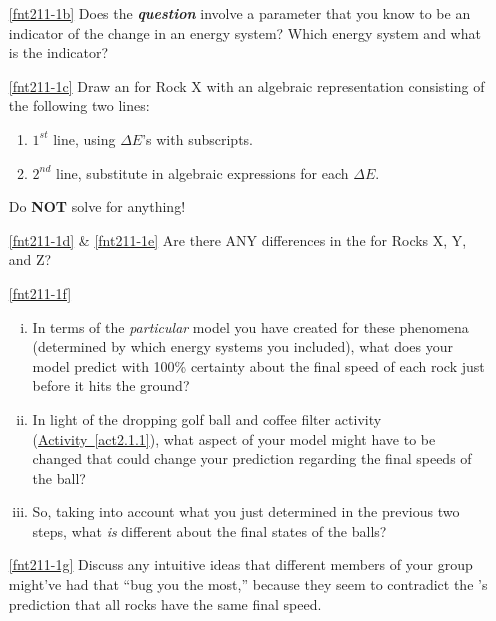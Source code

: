 \begin{enumerate}
	\item[\eqref{fnt211-1b}]	Does the \textbf{\em question} involve a parameter that you know to be an indicator of the change in an energy system?  Which energy system and what is the indicator?
	
	\item[\eqref{fnt211-1c}]	Draw an \EnergyDiagram{} for Rock X with an algebraic representation consisting of the following two lines:
	\begin{enumerate}
		\item $1^{st}$ line, using $\Delta E$'s with subscripts.
		\item $2^{nd}$ line, substitute in algebraic expressions for each $\Delta E$.
	\end{enumerate}
	Do \textbf{NOT} solve for anything!
	
	\item[\eqref{fnt211-1d} \& \eqref{fnt211-1e}] Are there ANY differences in the \EnergyDiagrams{} for Rocks X, Y, and Z?
	
	\item[\eqref{fnt211-1f}] \begin{enumerate}[(i)]
		\item In terms of the {\em particular} model you have created for these phenomena (determined by which energy systems you included), what does your model predict with 100\% certainty about the final speed of each rock just before it hits the ground?
		\label{fnt211-1fi}
		
		\item In light of the dropping golf ball and coffee filter activity (\hyperref[act2.1.1]{Activity~\ref*{act2.1.1}}), what aspect of your model might have to be changed that could change your prediction regarding the final speeds of the ball?
		
		\item So, taking into account what you just determined in the previous two steps, what \emph{is} different about the final states of the balls?
	\end{enumerate}
	
	\item[\eqref{fnt211-1g}]	Discuss any intuitive ideas that different members of your group might've had that ``bug you the most,'' because they seem to contradict the \EnergyInteractionModel{}'s prediction that all rocks have the same final speed.
\end{enumerate}

